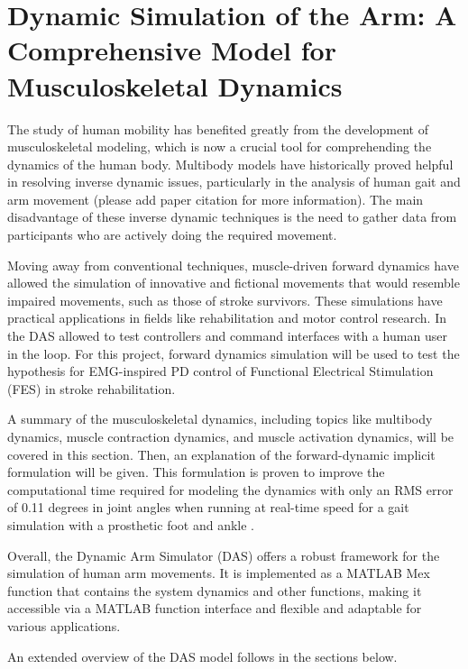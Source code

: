 \section{Dynamic Simulation of the Arm: A Comprehensive Model for Musculoskeletal Dynamics}
The study of human mobility has benefited greatly from the development of musculoskeletal modeling, which is now a crucial tool for comprehending the dynamics of the human body. Multibody models have historically proved helpful in resolving inverse dynamic issues, particularly in the analysis of human gait and arm movement (please add paper citation for more information). The main disadvantage of these inverse dynamic techniques is the need to gather data from participants who are actively doing the required movement.

Moving away from conventional techniques, muscle-driven forward dynamics have allowed the simulation of innovative and fictional movements that would resemble impaired movements, such as those of stroke survivors. These simulations have practical applications in fields like rehabilitation and motor control research. In \cite{IMP} the DAS allowed to test controllers and command interfaces with a human user in the loop. For this project, forward dynamics simulation will be used to test the hypothesis for EMG-inspired PD control of Functional Electrical Stimulation (FES) in stroke rehabilitation. 

A summary of the musculoskeletal dynamics, including topics like multibody dynamics, muscle contraction dynamics, and muscle activation dynamics, will be covered in this section. Then, an explanation of the forward-dynamic implicit formulation will be given. This formulation is proven to improve the computational time required for modeling the dynamics with only an RMS error of 0.11 degrees in joint angles when running at real-time speed for a gait simulation with a prosthetic foot and ankle \cite{IMP}.

Overall, the Dynamic Arm Simulator (DAS) offers a robust framework for the simulation of human arm movements. It is implemented as a MATLAB Mex function that contains the system dynamics and other functions, making it accessible via a MATLAB function interface and flexible and adaptable for various applications. 

An extended overview of the DAS model follows in the sections below.


